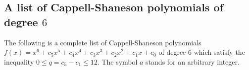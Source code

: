 \documentclass{amsart}
\theoremstyle{plain}
\theoremstyle{definition}
\newtheorem{prob}[thm]{Problem}
\theoremstyle{remark}
\begin{document}




\appendix

\begin{small}


\section{A list of Cappell-Shaneson polynomials of degree $6$}\label{app}


The following is a complete list of Cappell-Shaneson polynomials 
$f(x)=x^6+c_5x^5+c_4x^4+c_3x^3+c_2x^2+c_1x+c_0$ of degree $6$ which satisfy 
the inequality $0\leq q=c_5-c_1\leq 12$. The symbol $a$ stands for an arbitrary integer. 


\end{small}
\end{document}
